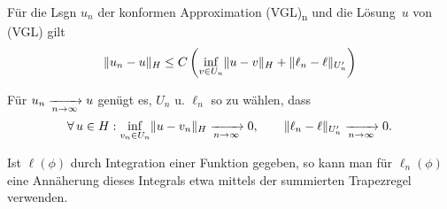\documentclass{cheat-sheet}
\newcommand{\tss}[1]{\textsubscript{#1}} %
\begin{document}
\begin{lem}
  Für die Lsgn $u_n$ der konformen Approximation (VGL)\tss{n} und die Lösung~$u$ von (VGL) gilt
  \[ \lVert u_n - u\rVert_H \leq C \left( \inf_{v \in U_n} \lVert u - v\rVert_H + \lVert\ell_n - \ell\rVert_{U_n'} \right) \]
\end{lem}

\begin{folgerung}
  Für $u_n \xrightarrow[n \to \infty]{} u$ genügt es, $U_n$ u. $\ell_n$ so zu wählen, dass
  \[
    \forall \, {u \in H\!} \,:\,\! \inf_{v_n \in U_n} \lVert u - v_n\rVert_H \xrightarrow[n \to \infty]{} 0, \qquad
    \lVert\ell_n - \ell\rVert_{U'_n} \xrightarrow[n \to \infty]{} 0.
  \]
\end{folgerung}

\begin{bem}
  Ist $\ell(\phi)$ durch Integration einer Funktion gegeben, so kann man für $\ell_n(\phi)$ eine Annäherung dieses Integrals etwa mittels der summierten Trapezregel verwenden.
\end{bem}
\end{document}
